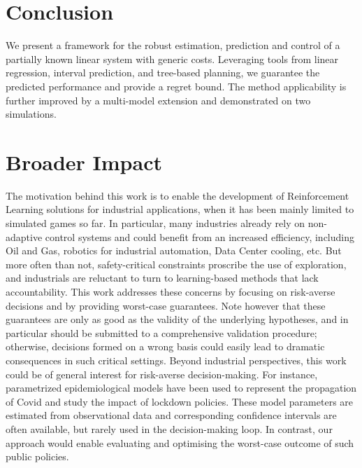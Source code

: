 \documentclass{article}
\begin{document}
\section*{Conclusion}

We present a framework for the robust estimation, prediction and control of a partially known linear system with generic costs. Leveraging tools from linear regression, interval prediction, and tree-based planning, we guarantee the predicted performance and provide a regret bound. The method applicability is further improved by a multi-model extension and demonstrated on two simulations.

\clearpage


\section*{Broader Impact}

The motivation behind this work is to enable the development of Reinforcement Learning solutions for industrial applications, when it has been mainly limited to simulated games so far. In particular, many industries already rely on non-adaptive control systems and could benefit from an increased efficiency, including Oil and Gas, robotics for industrial automation, Data Center cooling, etc. But more often than not, safety-critical constraints proscribe the use of exploration, and industrials are reluctant to turn to learning-based methods that lack accountability. This work addresses these concerns by focusing on risk-averse decisions and by providing worst-case guarantees. Note however that these guarantees are only as good as the validity of the underlying hypotheses, and  in particular should be submitted to a comprehensive validation procedure; otherwise, decisions formed on a wrong basis could easily lead to dramatic consequences in such critical settings.
Beyond industrial perspectives, this work could be of general interest for risk-averse decision-making. For instance, parametrized epidemiological models have been used to represent the propagation of Covid and study the impact of lockdown policies. These model parameters are estimated from observational data and corresponding confidence intervals are often available, but rarely used in the decision-making loop. In contrast, our approach would enable evaluating and optimising the worst-case outcome of such public policies.




\end{document}
